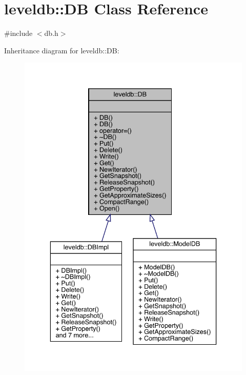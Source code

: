 \hypertarget{classleveldb_1_1_d_b}{}\section{leveldb\+::DB Class Reference}
\label{classleveldb_1_1_d_b}


{\ttfamily \#include $<$db.\+h$>$}



Inheritance diagram for leveldb\+::DB\+:
\nopagebreak
\begin{figure}[H]
\begin{center}
\leavevmode
\includegraphics[width=336pt]{classleveldb_1_1_d_b__inherit__graph}
\end{center}
\end{figure}


